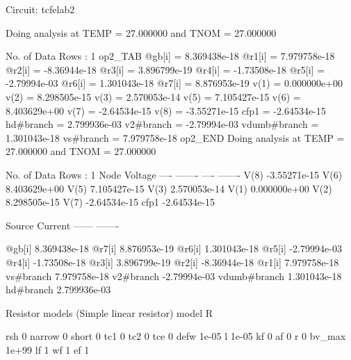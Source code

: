 
Circuit: tcfelab2

Doing analysis at TEMP = 27.000000 and TNOM = 27.000000


No. of Data Rows : 1
op2_TAB
@gb[i] = 8.369438e-18
@r1[i] = 7.979758e-18
@r2[i] = -8.36944e-18
@r3[i] = 3.896799e-19
@r4[i] = -1.73508e-18
@r5[i] = -2.79994e-03
@r6[i] = 1.301043e-18
@r7[i] = 8.876953e-19
v(1) = 0.000000e+00
v(2) = 8.298505e-15
v(3) = 2.570053e-14
v(5) = 7.105427e-15
v(6) = 8.403629e+00
v(7) = -2.64534e-15
v(8) = -3.55271e-15
cfp1 = -2.64534e-15
hd#branch = 2.799936e-03
v2#branch = -2.79994e-03
vdumb#branch = 1.301043e-18
vs#branch = 7.979758e-18
op2_END
Doing analysis at TEMP = 27.000000 and TNOM = 27.000000


No. of Data Rows : 1
	Node                                  Voltage
	----                                  -------
	----	-------
	V(8)                             -3.55271e-15
	V(6)                             8.403629e+00
	V(5)                             7.105427e-15
	V(3)                             2.570053e-14
	V(1)                             0.000000e+00
	V(2)                             8.298505e-15
	V(7)                             -2.64534e-15
	cfp1                             -2.64534e-15

	Source	Current
	------	-------

	@gb[i]                           8.369438e-18
	@r7[i]                           8.876953e-19
	@r6[i]                           1.301043e-18
	@r5[i]                           -2.79994e-03
	@r4[i]                           -1.73508e-18
	@r3[i]                           3.896799e-19
	@r2[i]                           -8.36944e-18
	@r1[i]                           7.979758e-18
	vs#branch                        7.979758e-18
	v2#branch                        -2.79994e-03
	vdumb#branch                     1.301043e-18
	hd#branch                        2.799936e-03

 Resistor models (Simple linear resistor)
      model                     R

        rsh                     0
     narrow                     0
      short                     0
        tc1                     0
        tc2                     0
        tce                     0
       defw                 1e-05
          l                 1e-05
         kf                     0
         af                     0
          r                     0
     bv_max                 1e+99
         lf                     1
         wf                     1
         ef                     1

